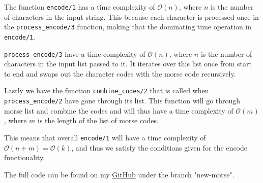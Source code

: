 \documentclass[a4paper,11pt]{article}
\begin{document}
The function {\tt encode/1} has a time complexity of $\mathcal{O}(n)$, where $n$ is the number of characters in the input string. This because 
each character is processed once in the {\tt process\_encode/3} function, making that the dominating time operation in {\tt encode/1}.

{\tt process\_encode/3} have a time complexity of $\mathcal{O}(n)$, where $n$ is the number of characters in the input list passed to it. It 
iterates over this list once from start to end and swaps out the character codes with the morse code recursively.

Lastly we have the function {\tt combine\_codes/2} that is called when \\{\tt process\_encode/2} have gone through its list. This function will 
go through morse list and combine the codes and will thus have a time complexity of $\mathcal{O}(m)$, where $m$ is the length of the list of 
morse codes.

This means that overall {\tt encode/1} will have a time complexity of \\$\mathcal{O}(n+m) = \mathcal{O}(k)$, and thus we satisfy the conditions
given for the encode functionality.

The full code can be found on my \href{https://github.com/adrian-jonsson-sjoedin/ID1019-Programming-II/tree/main/Task1_Solution}{GitHub} under 
the branch "new-morse".
\end{document}
